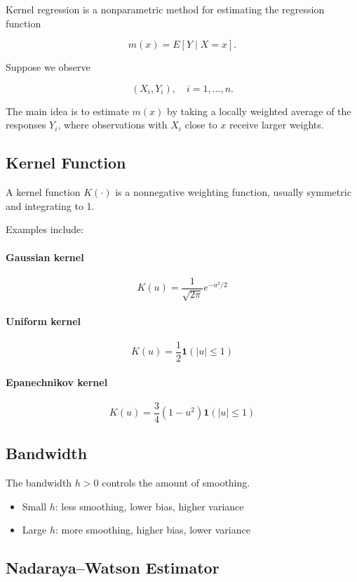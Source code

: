 \documentclass[a4paper,10pt]{article}
\begin{document}
Kernel regression is a nonparametric method for estimating the regression function

\[
m(x)=E[Y\mid X=x].
\]

Suppose we observe

\[
(X_i,Y_i), \quad i=1,\dots,n.
\]

The main idea is to estimate $m(x)$ by taking a locally weighted average of the responses $Y_i$, where observations with $X_i$ close to $x$ receive larger weights.

\subsection{Kernel Function}

A kernel function $K(\cdot)$ is a nonnegative weighting function, usually symmetric and integrating to 1.

Examples include:

\paragraph{Gaussian kernel}
\[
K(u)=\frac{1}{\sqrt{2\pi}}e^{-u^2/2}
\]

\paragraph{Uniform kernel}
\[
K(u)=\frac{1}{2}\mathbf{1}(|u|\le 1)
\]

\paragraph{Epanechnikov kernel}
\[
K(u)=\frac{3}{4}(1-u^2)\mathbf{1}(|u|\le 1)
\]

\subsection{Bandwidth}

The bandwidth $h>0$ controls the amount of smoothing.

\begin{itemize}
\item Small $h$: less smoothing, lower bias, higher variance
\item Large $h$: more smoothing, higher bias, lower variance
\end{itemize}

\subsection{Nadaraya--Watson Estimator}
\end{document}
